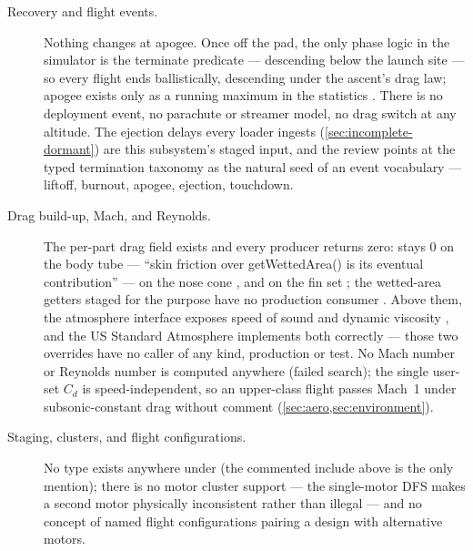 \begin{description}

\item[Recovery and flight events.] Nothing changes at apogee. Once off the pad, the only
phase logic in the simulator is the terminate predicate --- descending below the launch site
 --- so every flight ends ballistically, descending under
the ascent's drag law; apogee exists only as a running maximum in the statistics
. There is no deployment event, no parachute or
streamer model, no drag switch at any altitude. The ejection delays every loader ingests
(\cref{sec:incomplete-dormant}) are this subsystem's staged input, and the review points at
the typed termination taxonomy  as the natural seed of an event
vocabulary --- liftoff, burnout, apogee, ejection, touchdown.

\item[Drag build-up, Mach, and Reynolds.] The per-part drag field exists and every producer
returns zero:  stays 0 on the body tube --- ``skin friction over getWettedArea()
is its eventual contribution''  --- on the nose cone
, and on the fin set
; the wetted-area getters staged for the purpose have no
production consumer . Above them, the atmosphere interface exposes
speed of sound and dynamic viscosity , and the US Standard
Atmosphere implements both correctly  --- those two
overrides have no caller of any kind, production or test. No Mach number or Reynolds number
is computed anywhere (failed search); the single user-set $C_d$ is speed-independent, so an
upper-class flight passes Mach~1 under subsonic-constant drag without comment
(\cref{sec:aero,sec:environment}).

\item[Staging, clusters, and flight configurations.] No  type exists anywhere
under  (the commented include above is the only mention); there is no motor
cluster support --- the single-motor DFS makes a second motor physically inconsistent
rather than illegal --- and no concept of named flight configurations pairing a design with
alternative motors.


\end{description}
